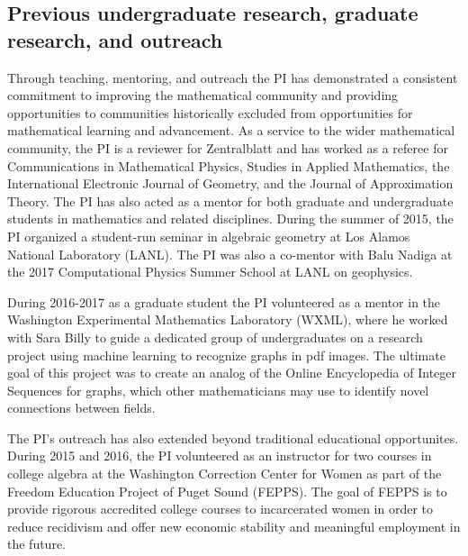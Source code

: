 \documentclass[11pt,letterpaper]{article}
\theoremstyle{definition}
\begin{document}
\subsection{Previous undergraduate research, graduate research, and outreach}
Through teaching, mentoring, and outreach the PI has demonstrated a consistent commitment to improving the mathematical community and providing opportunities to communities historically excluded from opportunities for mathematical learning and advancement.
As a service to the wider mathematical community, the PI is a reviewer for Zentralblatt and has worked as a referee for Communications in Mathematical Physics, Studies in Applied Mathematics, the International Electronic Journal of Geometry, and the Journal of Approximation Theory.
The PI has also acted as a mentor for both graduate and undergraduate students in mathematics and related disciplines.
During the summer of 2015, the PI organized a student-run seminar in algebraic geometry at Los Alamos National Laboratory (LANL).
The PI was also a co-mentor with Balu Nadiga at the 2017 Computational Physics Summer School at LANL on geophysics.

During 2016-2017 as a graduate student the PI volunteered as a mentor in the Washington Experimental Mathematics Laboratory (WXML), where he worked with Sara Billy to guide a dedicated group of undergraduates on a research project using machine learning to recognize graphs in pdf images.
The ultimate goal of this project was to create an analog of the Online Encyclopedia of Integer Sequences for graphs, which other mathematicians may use to identify novel connections between fields.

The PI's outreach has also extended beyond traditional educational opportunites.
During 2015 and 2016, the PI volunteered as an instructor for two courses in college algebra at the Washington Correction Center for Women as part of the Freedom Education Project of Puget Sound (FEPPS).
The goal of FEPPS is to provide rigorous accredited college courses to incarcerated women in order to reduce recidivism and offer new economic stability and meaningful employment in the future.

\end{document}
